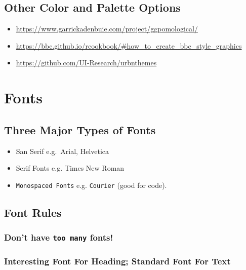 \documentclass[]{tufte-handout}
\providecommand{\tightlist}{%
  \setlength{\itemsep}{0pt}\setlength{\parskip}{0pt}}
\begin{document}
\hypertarget{other-color-and-palette-options}{%
\subsection{Other Color and Palette
Options}\label{other-color-and-palette-options}}

\begin{itemize}
\tightlist
\item
  \url{https://www.garrickadenbuie.com/project/ggpomological/}
\item
  \url{https://bbc.github.io/rcookbook/\#how_to_create_bbc_style_graphics}
\item
  \url{https://github.com/UI-Research/urbnthemes}
\end{itemize}

\hypertarget{fonts}{%
\section{Fonts}\label{fonts}}

\hypertarget{three-major-types-of-fonts}{%
\subsection{Three Major Types of
Fonts}\label{three-major-types-of-fonts}}

\begin{itemize}
\tightlist
\item
  San Serif e.g.~Arial, Helvetica
\item
  Serif Fonts e.g. Times New Roman
\item
  \texttt{Monospaced\ Fonts} e.g. \texttt{Courier} (good for code).
\end{itemize}

\hypertarget{font-rules}{%
\subsection{Font Rules}\label{font-rules}}

\hypertarget{dont-have-too-many-fonts}{%
\subsubsection{\texorpdfstring{Don't have \texttt{too\ many}
fonts!}{Don't have too many fonts!}}\label{dont-have-too-many-fonts}}

\hypertarget{interesting-font-for-heading-standard-font-for-text}{%
\subsubsection{Interesting Font For Heading; Standard Font For
Text}\label{interesting-font-for-heading-standard-font-for-text}}
\end{document}
